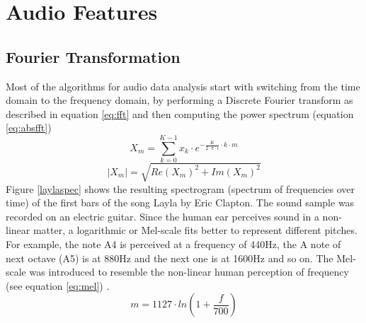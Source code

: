 \section{Audio Features}

\subsection{Fourier Transformation}\label{featsec}

Most of the algorithms for audio data analysis start with switching from the time domain to the frequency domain, by performing a Discrete Fourier transform as described in equation \ref{eq:fft} and then computing the power spectrum (equation \ref{eq:absfft}) 
\begin{equation} \label{eq:fft}
X_m = \sum_{k=0}^{K-1}{x_k \cdot e^ { - \frac{K}{ 2 \cdot \pi \cdot i}\cdot k\cdot m}}
\end{equation}
\begin{equation} \label{eq:absfft}
|X_m| = \sqrt{Re(X_m)^2 + Im(X_m)^2}
\end{equation}
Figure \ref{laylaspec} shows the resulting spectrogram (spectrum of frequencies over time) of the first bars of the song Layla by Eric Clapton. The sound sample was recorded on an electric guitar. Since the human ear perceives sound in a non-linear matter, a logarithmic or Mel-scale fits better to represent different pitches. For example, the note A4 is perceived at a frequency of 440Hz, the A note of next octave (A5) is at 880Hz and the next one is at 1600Hz and so on. The Mel-scale was introduced to resemble the non-linear human perception of frequency (see equation \ref{eq:mel}) \cite[pp. 53f]{knees1}.
\begin{equation} \label{eq:mel}
m = 1127 \cdot ln(1 + \frac{f}{700})
\end{equation}
